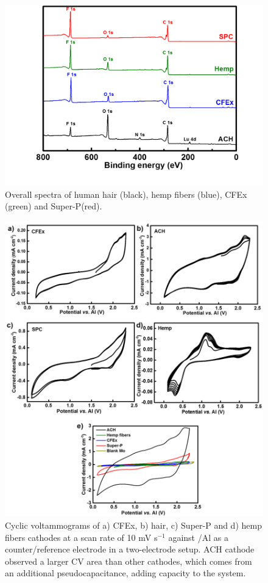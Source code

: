 \begin{figure}[h!]
\centering
\includegraphics[width=\textwidth]{Figures/chap5fig/XPSoverall}
\caption{Overall spectra of human hair (black), hemp fibers (blue), CFEx (green) and Super-P(red).}
\label{Figures/chap5fig:XPSoverall}
\end{figure}

 \begin{figure}[h!]
  \centering
  \includegraphics[width=\textwidth]{Figures/chap5fig/CV}
    \caption{Cyclic voltammograms of a) CFEx, b) hair, c) Super-P and d) hemp fibers cathodes at a scan rate of 10 mV s$^{-1}$ against /Al as a counter/reference electrode in a two-electrode setup. ACH cathode observed a larger CV area than other cathodes, which comes from an additional pseudocapacitance, adding capacity to the system.}
  \label{Figures/chap5fig:CV}
\end{figure}
